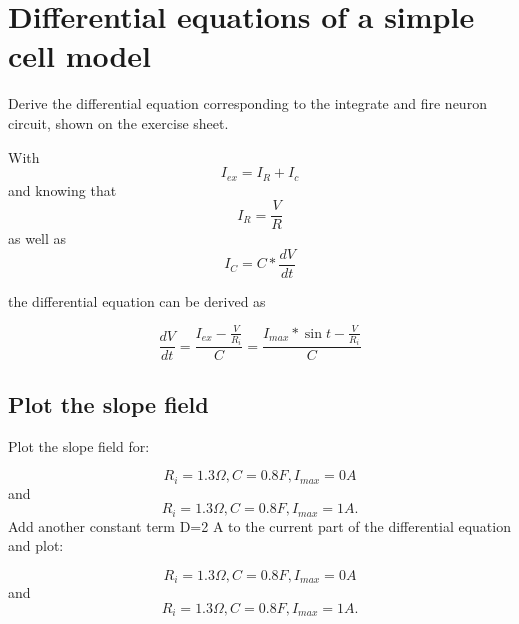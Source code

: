 \documentclass{scrartcl}			%
\begin{document}
\section{Differential equations of a simple cell model}		%

Derive the differential equation corresponding to the integrate and fire neuron circuit, shown on the exercise sheet.

With
\begin{equation}
	I_{ex}=I_R + I_c
\end{equation}
and knowing that
\begin{equation}
	I_R = \frac{V}{R}
\end{equation}
as well as
\begin{equation}
	I_C = C * \frac{dV}{dt}
\end{equation}

the differential equation can be derived as

\begin{equation}
	\frac{dV}{dt} = \frac{I_{ex}-\frac{V}{R_{i}}}{C} = \frac{I_{max}*\sin{t}-\frac{V}{R_{i}}}{C} 
	\label{cellDGL}
\end{equation}

\subsection{Plot the slope field}
Plot the slope field for:

\begin{equation*}
	R_{i} = 1.3  \Omega, C = 0.8 F, I_{max} = 0 A
	\label{param1}
\end{equation*}
and
\begin{equation*}
	R_{i} = 1.3  \Omega, C = 0.8 F, I_{max} = 1 A.
	\label{param2}
\end{equation*}
\linespace
Add another constant term D=2 A to the current part of the differential equation and plot:

\begin{equation*}
	R_{i} = 1.3  \Omega, C = 0.8 F, I_{max} = 0 A
	\label{param3}
\end{equation*}
and
\begin{equation*}
	R_{i} = 1.3  \Omega, C = 0.8 F, I_{max} = 1 A.
	\label{param4}
\end{equation*}
\end{document}
